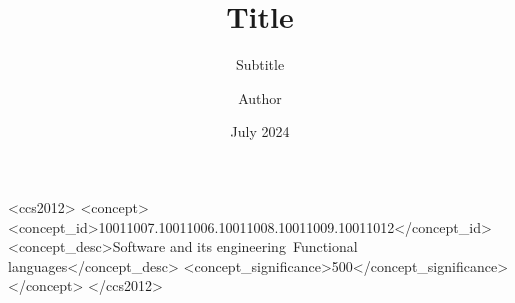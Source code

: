 \documentclass[sigconf]{acmart}
\title{Title}
\subtitle{Subtitle}
\author{Author}
\date{July 2024}
\begin{document}
\begin{CCSXML}
<ccs2012>
   <concept>
       <concept_id>10011007.10011006.10011008.10011009.10011012</concept_id>
       <concept_desc>Software and its engineering~Functional languages</concept_desc>
       <concept_significance>500</concept_significance>
    </concept>
 </ccs2012>
\end{CCSXML}

\begin{abstract}
    \blindtext{}
\end{abstract}


\maketitle


\end{document}
